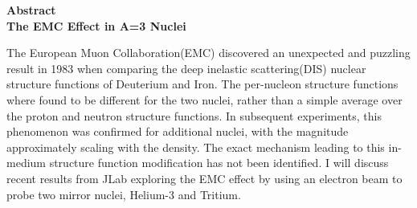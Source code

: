 \begin{center}
	{\large \textbf{Abstract}}\\
	
	{\large \textbf{The EMC Effect in A=3 Nuclei}}\\
\end{center}

The European Muon Collaboration(EMC) discovered an unexpected and puzzling result in 1983 when comparing the deep inelastic scattering(DIS) nuclear structure functions of Deuterium and Iron. The per-nucleon structure functions where found to be different for the two nuclei, rather than a simple average over the proton and neutron structure functions.  In subsequent experiments, this phenomenon was confirmed for additional nuclei, with the magnitude approximately scaling with the density.  The exact mechanism leading to this in-medium structure function modification has not been identified.  I will discuss recent results from JLab exploring the EMC effect by using an electron beam to probe two mirror nuclei, Helium-3 and Tritium. 
